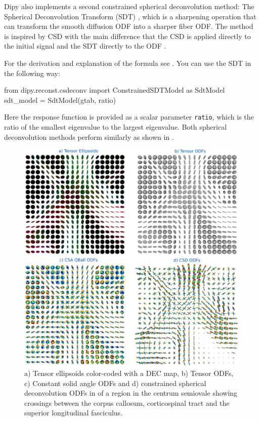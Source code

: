 \documentclass{bioinfo}
\begin{document}
Dipy also implements a second constrained spherical deconvolution method: The
Spherical Deconvolution Transform (SDT)
\citep{descoteaux-deriche-etal:09}, which is a sharpening
operation that can transform the smooth diffusion ODF into a sharper
fiber ODF. The method is
inspired by CSD \cite{tournier-calamante-etal:07} with the main difference
that the CSD is applied directly to the initial signal and the SDT directly to
the ODF \citep{descoteaux:08,descoteaux-deriche-etal:09}.

For the derivation and explanation of the formula see \cite{descoteaux-deriche-etal:09}. You can use the SDT in the following way:
\begin{python}
from dipy.reconst.csdeconv import
                  ConstrainedSDTModel as SdtModel
sdt_model = SdtModel(gtab, ratio)
\end{python}
Here the response function is provided as a scalar parameter \texttt{ratio},
which is the ratio of the
smallest eigenvalue to the largest eigenvalue. Both spherical deconvolution
methods perform similarly as shown in
\citep{descoteaux-deriche-etal:09,GaryfallidisISBI2013a}.

\begin{figure}[!htb]
\centerline{\includegraphics[width=180mm]{Figures/ten_csa_csd2.jpg}}
\caption{a) Tensor ellipsoids color-coded with a DEC map, b) Tensor
  ODFs, c) Constant solid angle ODFs and d) constrained spherical deconvolution
  ODFs in of a region in the centrum semiovale showing crossings between the
  corpus callosum, corticospinal tract and the superior longitudinal fasciculus.
\label{Fig:ten_csa_csd}}
\end{figure}
\end{document}
